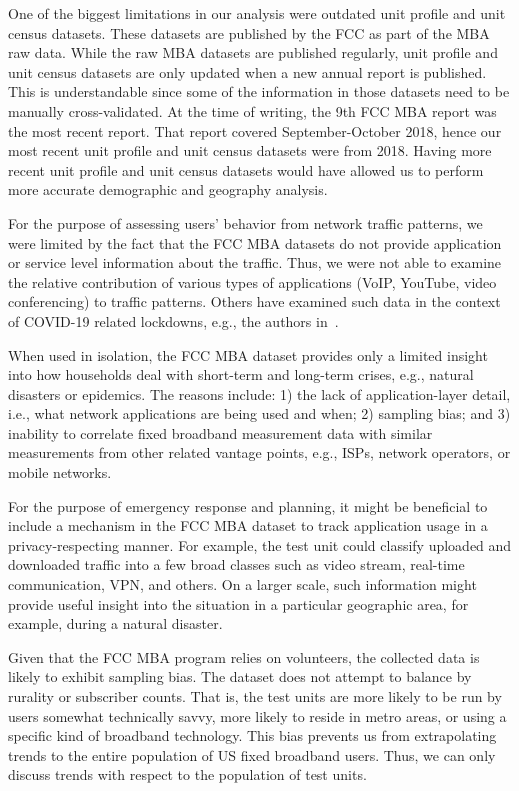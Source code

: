 \documentclass[conference,10pt]{IEEEtran}
\begin{document}
One of the biggest limitations in our analysis were outdated unit profile and unit census datasets. These datasets are published by the \gls{FCC} as part of the \gls{MBA} raw data. While the raw \gls{MBA} datasets are published regularly, unit profile and unit census datasets are only updated when a new annual report is published. This is understandable since some of the information in those datasets need to be manually cross-validated. At the time of writing, the 9th \gls{FCC} \gls{MBA} report was the most recent report. That report covered September-October 2018, hence our most recent unit profile and unit census datasets were from 2018. Having more recent unit profile and unit census datasets would have allowed us to perform more accurate demographic and geography analysis.

For the purpose of assessing users' behavior from network traffic patterns, we were limited by the fact that the \gls{FCC} \gls{MBA} datasets do not provide application or service level information about the traffic. Thus, we were not able to examine the relative contribution of various types of applications (\gls{VoIP}, YouTube, video conferencing) to traffic patterns. Others have examined such data in the context of COVID-19 related lockdowns, e.g., the authors in~\cite{bottger2020internet}.

When used in isolation, the \gls{FCC} \gls{MBA} dataset provides only a limited insight into how households deal with short-term and long-term crises, e.g., natural disasters or epidemics. The reasons include: 1) the lack of application-layer detail, i.e., what network applications are being used and when; 2) sampling bias; and 3) inability to correlate fixed broadband measurement data with similar measurements from other related vantage points, e.g., \glspl{ISP}, network operators, or mobile networks.

For the purpose of emergency response and planning, it might be beneficial to include a mechanism in the \gls{FCC} \gls{MBA} dataset to track application usage in a privacy-respecting manner. For example, the test unit could classify uploaded and downloaded traffic into a few broad classes such as video stream, real-time communication, \gls{VPN}, and others. On a larger scale, such information might provide useful insight into the situation in a particular geographic area, for example, during a natural disaster.

Given that the \gls{FCC} \gls{MBA} program relies on volunteers, the collected data is likely to exhibit sampling bias. The dataset does not attempt to balance by rurality or subscriber counts. That is, the test units are more likely to be run by users somewhat technically savvy, more likely to reside in metro areas, or using a specific kind of broadband technology. This bias prevents us from extrapolating trends to the entire population of \gls{US} fixed broadband users. Thus, we can only discuss trends with respect to the population of test units.
\end{document}
